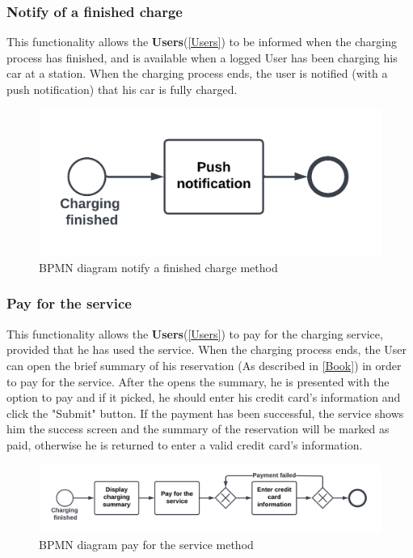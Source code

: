 \subsubsection{Notify of a finished charge}
This functionality allows the \textbf{Users}(\ref{Users}) to be informed when the charging process has finished, and is available when a logged User has been charging his car at a station.
When the charging process ends, the user is notified (with a push notification) that his car is fully charged.
\begin{figure}[H]
    \begin{center}
        \includegraphics[scale=0.2]{img/fun-not-fin.png}
        \caption{BPMN diagram notify a finished charge method}
    \end{center}
\end{figure}
\subsubsection{Pay for the service}
This functionality allows the \textbf{Users}(\ref{Users}) to pay for the charging service, provided that he has used the service.
When the charging process ends, the User can open the brief summary of his reservation (As described in \ref{Book}) in order to pay for the service.
After the opens the summary, he is presented with the option to pay and if it picked, he should enter his credit card's information and click the "Submit" button.
If the payment has been successful, the service shows him the success screen and the summary of the reservation will be marked as paid, otherwise he is returned to enter a valid credit card's information.
\begin{figure}[H]
    \begin{center}
        \includegraphics[width=\textwidth]{img/fun-pay.png}
        \caption{BPMN diagram pay for the service method}
    \end{center}
\end{figure}
